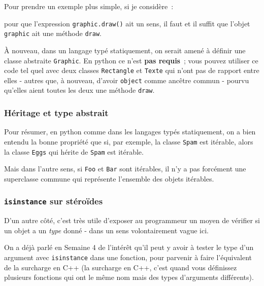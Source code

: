     Pour prendre un exemple plus simple, si je considère~:

\begin{Shaded}
\begin{Highlighting}[frame=lines,framerule=0.6mm,rulecolor=\color{asisframecolor}]
\end{Highlighting}
\end{Shaded}

pour que l'expression \texttt{graphic.draw()} ait un sens, il faut et il
suffit que l'objet \texttt{graphic} ait une méthode \texttt{draw}.

    À nouveau, dans un langage typé statiquement, on serait amené à définir
une classe abstraite \texttt{Graphic}. En python ce n'est \textbf{pas
requis}~; vous pouvez utiliser ce code tel quel avec deux classes
\texttt{Rectangle} et \texttt{Texte} qui n'ont pas de rapport entre
elles - autres que, à nouveau, d'avoir \texttt{object} comme ancêtre
commun - pourvu qu'elles aient toutes les deux une méthode
\texttt{draw}.

    \hypertarget{huxe9ritage-et-type-abstrait}{%
\subsubsection{Héritage et type
abstrait}\label{huxe9ritage-et-type-abstrait}}

    Pour résumer, en python comme dans les langages typés statiquement, on a
bien entendu la bonne propriété que si, par exemple, la classe
\texttt{Spam} est itérable, alors la classe \texttt{Eggs} qui hérite de
\texttt{Spam} est itérable.

Mais dans l'autre sens, si \texttt{Foo} et \texttt{Bar} sont itérables,
il n'y a pas forcément une superclasse commune qui représente l'ensemble
des objets itérables.

    \hypertarget{isinstance-sur-stuxe9rouxefdes}{%
\subsubsection{\texorpdfstring{\texttt{isinstance} sur
stéroïdes}{isinstance sur stéroïdes}}\label{isinstance-sur-stuxe9rouxefdes}}

    D'un autre côté, c'est très utile d'exposer au programmeur un moyen de
vérifier si un objet a un \emph{type} donné - dans un sens
volontairement vague ici.

On a déjà parlé en Semaine 4 de l'intérêt qu'il peut y avoir à tester le
type d'un argument avec \texttt{isinstance} dans une fonction, pour
parvenir à faire l'équivalent de la surcharge en C++ (la surcharge en
C++, c'est quand vous définissez plusieurs fonctions qui ont le même nom
mais des types d'arguments différents).

